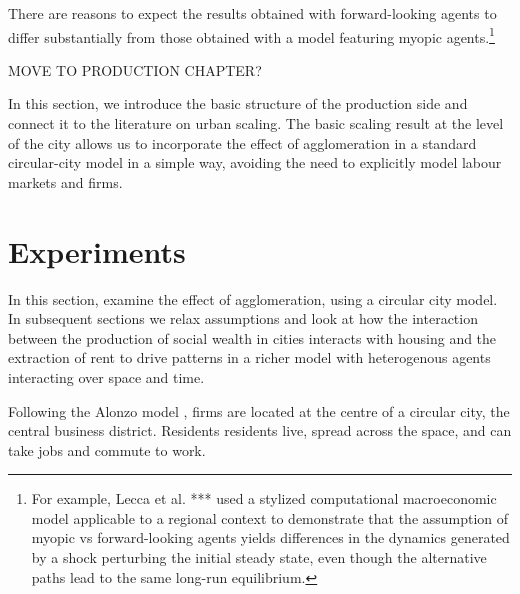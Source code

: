 There are reasons to expect the results obtained with  forward-looking agents to differ substantially from those obtained with a model featuring myopic agents.\footnote{For example, Lecca et al. *** \cite{Lecca-et-al-2013}  used a stylized computational macroeconomic model applicable to a regional context to demonstrate that the assumption of myopic vs forward-looking agents yields differences in the dynamics generated by a shock perturbing the initial steady state, even though the alternative paths lead to the same long-run equilibrium.} 

 
{ MOVE TO PRODUCTION CHAPTER?

In this section, we introduce the basic structure of the production side and connect it to the literature on urban scaling. The basic scaling result at the level of the city allows us to incorporate the effect of agglomeration in a standard  circular-city model in a simple way, avoiding the need to explicitly model labour markets and firms.
}



\section{Experiments}
In this section, examine the effect of agglomeration, using a circular city model. In subsequent sections we relax assumptions and look at how the interaction between the production of social wealth in cities interacts with housing and the extraction of rent to drive patterns in a richer model with heterogenous agents interacting over space and time. 



Following the Alonzo model \cite{alonzoTheoryUrbanLand1960}, firms are located at the centre of a circular city, the central business district. Residents residents live, spread across the space, and can take jobs and commute to work.

